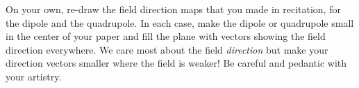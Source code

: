 \documentclass[12pt]{article}
\begin{document}
\startproblem%
On your own, re-draw the field direction maps that you made in
recitation, for the dipole and the quadrupole.
In each case, make the dipole or quadrupole small in the center of your paper and
fill the plane with vectors showing the field direction everywhere.
We care most about the field \emph{direction} but make
your direction vectors smaller where the field is weaker!
Be careful and pedantic with your artistry.
\end{document}
